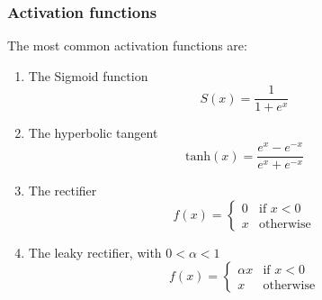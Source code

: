 \documentclass[12pt,a4paper,twoside,openright]{report}
\begin{document}
\subsubsection{Activation functions}
The most common activation functions are:
\begin{enumerate}
\item The Sigmoid function
\begin{equation}
S(x) = \frac{1}{1 + e^x} 
\end{equation}
\item The hyperbolic tangent
\begin{equation}
	\textrm{tanh}(x)=\frac{e^x - e^{-x}}{e^x + e^{-x}}
\end{equation}
\item The rectifier
\begin{equation}
\label{eq:linear_rectifier}
	f(x) = 
\begin{cases}
	0 & \text{if } x < 0\\
	x & \text{otherwise}
\end{cases}
\end{equation}
\item The leaky rectifier, with $0 < \alpha < 1$
\begin{equation}
f(x) = 
\begin{cases}
	\alpha x & \text{if } x < 0\\
	x & \text{otherwise}
\end{cases}
\end{equation}
\end{enumerate}
\end{document}

